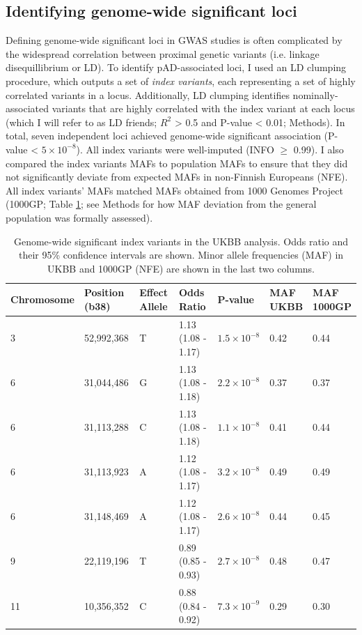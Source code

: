   \subsection{Identifying genome-wide significant loci}
  Defining genome-wide significant loci in GWAS studies is often complicated by the widespread correlation between proximal genetic variants (i.e. linkage disequillibrium or LD). To identify pAD-associated loci, I used an LD clumping procedure, which outputs a set of \textit{index variants}, each representing a set of highly correlated variants in a locus. Additionally, LD clumping identifies nominally-associated variants that are highly correlated with the index variant at each locus (which I will refer to as LD friends; $R^{2}$ > 0.5 and P-value < 0.01; Methods). In total, seven independent loci achieved genome-wide significant association (P-value < $5\times10^{-8}$). All index variants were well-imputed (INFO $\geq$ 0.99). I also compared the index variants MAFs to population MAFs to ensure that they did not significantly deviate from expected MAFs in non-Finnish Europeans (NFE). All index variants' MAFs matched MAFs obtained from 1000 Genomes Project (1000GP; Table \ref{table:gws}; see Methods for how MAF deviation from the general population was formally assessed). 

  \begin{table}[htb]
    \centering\begingroup\fontsize{10}{14}\selectfont
    \caption{Genome-wide significant index variants in the UKBB analysis. Odds ratio and their 95\% confidence intervals are shown. Minor allele frequencies (MAF) in UKBB and 1000GP (NFE) are shown in the last two columns.}
    \label{table:gws}
    \begin{tabular}[t]{|l|l|l|l|l|l|l|}
      \hline
      Chromosome & Position (b38) & Effect Allele & Odds Ratio & P-value & \makecell{MAF\\ UKBB} & \makecell{MAF\\ 1000GP}\\
      \hline
      3 & 52,992,368 & T & 1.13 (1.08 - 1.17) & $1.5\times10^{-8}$ & 0.42 & 0.44\\
      \hline
      6 & 31,044,486 & G & 1.13 (1.08 - 1.18) & $2.2\times10^{-8}$ & 0.37 & 0.37\\
      \hline
      6 & 31,113,288 & C & 1.13 (1.08 - 1.18) & $1.1\times10^{-8}$ & 0.41 & 0.44\\
      \hline
      6 & 31,113,923 & A & 1.12 (1.08 - 1.17) & $3.2\times10^{-8}$ & 0.49 & 0.49\\
      \hline
      6 & 31,148,469 & A & 1.12 (1.08 - 1.17) & $2.6\times10^{-8}$ & 0.44 & 0.45\\
      \hline
      9 & 22,119,196 & T & 0.89 (0.85 - 0.93) & $2.7\times10^{-8}$ & 0.48 & 0.47\\
      \hline
      11 & 10,356,352 & C & 0.88 (0.84 - 0.92) & $7.3\times10^{-9}$ & 0.29 & 0.30\\
      \hline
      \end{tabular}

    \endgroup{}

    \end{table}

